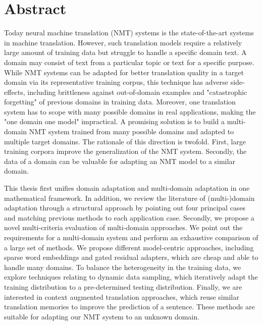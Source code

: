 \chapter*{Abstract}
Today neural machine translation (NMT) systems is the state-of-the-art systems in machine translation. However, such translation models require a relatively large amount of training data but struggle to handle a specific domain text. A domain may consist of text from a particular topic or text for a specific purpose. While NMT systems can be adapted for better translation quality in a target domain via its representative training corpus, this technique has adverse side-effects, including brittleness against out-of-domain examples and "catastrophic forgetting" of previous domains in training data. Moreover, one translation system has to scope with many possible domains in real applications, making the "one domain one model" impractical. A promising solution is to build a multi-domain NMT system trained from many possible domains and adapted to multiple target domains. The rationale of this direction is twofold. First, large training corpora improve the generalization of the NMT system. Secondly, the data of a domain can be valuable for adapting an NMT model to a similar domain.

This thesis first unifies domain adaptation and multi-domain adaptation in one mathematical framework. In addition, we review the literature of (multi-)domain adaptation through a structural approach by pointing out four principal cases and matching previous methods to each application case. Secondly, we propose a novel multi-criteria evaluation of multi-domain approaches. We point out the requirements for a multi-domain system and perform an exhaustive comparison of a large set of methods. We propose different model-centric approaches, including sparse word embeddings and gated residual adapters, which are cheap and able to handle many domains. To balance the heterogeneity in the training data, we explore techniques relating to dynamic data sampling, which iteratively adapt the training distribution to a pre-determined testing distribution. Finally, we are interested in context augmented translation approaches, which reuse similar translation memories to improve the prediction of a sentence. These methods are suitable for adapting our NMT system to an unknown domain.

